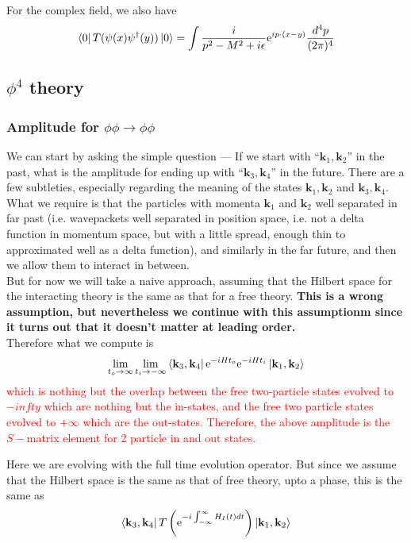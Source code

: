 \documentclass[11pt, notitlepage]{report}
\newcommand{\e}{\mathrm{e}}
\numberwithin{equation}{section}
\begin{document}
    For the complex field, we also have 
    \begin{equation*}
        \bra{0} T ( \psi(x) \psi^\dagger(y) )\ket{0} = \int \frac{i}{p^2 - M^2 + i\epsilon} \e^{ip\cdot(x-y)} \frac{d^4p}{(2\pi)^4}
    \end{equation*}

    \subsection{\(\phi^4\) theory}
    \subsubsection{Amplitude for \(\phi\phi \to \phi\phi\)}
    We can start by asking the simple question — If we start with ``\(\textbf{k}_1,\textbf{k}_2\)'' in the past, what is the amplitude for ending up with ``\(\textbf{k}_3, \textbf{k}_4\)'' in the future. There are a few subtleties, especially regarding the meaning of the states \(\textbf{k}_1,\textbf{k}_2\) and \(\textbf{k}_3, \textbf{k}_4\). What we require is that the particles with momenta \(\textbf{k}_1\) and \(\textbf{k}_2\) well separated in far past (i.e. wavepackets well separated in position space, i.e. not a delta function in momentum space, but with a little spread, enough thin to approximated well as a delta function), and similarly in the far future, and then we allow them to interact in between. \\
    But for now we will take a naive approach, assuming that the Hilbert space for the interacting theory is the same as that for a free theory. \textbf{This is a wrong assumption, but nevertheless we continue with this assumptionm since it turns out that it doesn't matter at leading order.}\\ 
    Therefore what we compute is 
    \begin{equation*}
        \lim_{t_o\to \infty}\lim_{t_i\to -\infty}\bra{\textbf{k}_3, \textbf{k}_4} \e^{-iHt_o}\e^{-iHt_i} \ket{\textbf{k}_1, \textbf{k}_2}
    \end{equation*}
    \textcolor{red}{
        which is nothing but the overlap between the free two-particle states evolved to \(-infty\) which are nothing but the in-states, and the free two particle states evolved to \(+\infty\) which are the out-states. Therefore, the above amplitude is the \(S-\)matrix element for 2 particle in and out states.\\
    }

    Here we are evolving with the full time evolution operator. But since we assume that the Hilbert space is the same as that of free theory, upto a phase, this is the same as 
    \begin{equation*}
        \bra{\textbf{k}_3, \textbf{k}_4} T\left(\e^{-i\int_{-\infty}^{\infty}H_I(t) dt }\right) \ket{\textbf{k}_1, \textbf{k}_2}
    \end{equation*}
\end{document}
